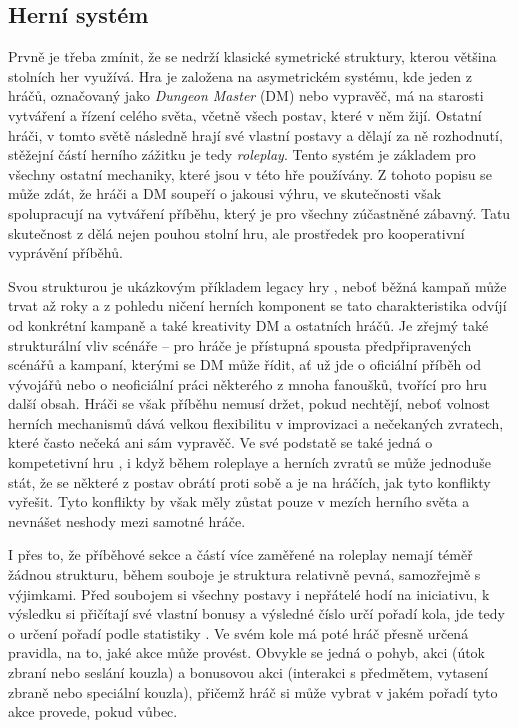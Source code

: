 \subsection{Herní systém}
\label{subsec:dnd_gameplay}

Prvně je třeba zmínit, že \dnd{} se nedrží klasické symetrické struktury, kterou většina stolních her využívá. Hra je založena na asymetrickém systému, kde jeden z hráčů, označovaný jako \textit{Dungeon Master} (DM) nebo vypravěč, má na starosti vytváření a řízení celého světa, včetně všech postav, které v něm žijí. Ostatní hráči, v tomto světě následně hrají své vlastní postavy a dělají za ně rozhodnutí, stěžejní částí herního zážitku je tedy \textit{roleplay}. Tento systém je základem pro všechny ostatní mechaniky, které jsou v této hře používány. Z tohoto popisu se může zdát, že hráči a DM soupeří o jakousi výhru, ve skutečnosti však spolupracují na vytváření příběhu, který je pro všechny zúčastněné zábavný. Tatu skutečnost z \dnd{} dělá nejen pouhou stolní hru, ale prostředek pro kooperativní vyprávění příběhů.

Svou strukturou je \dnd{} ukázkovým příkladem legacy hry , neboť běžná kampaň může trvat až roky a z pohledu ničení herních komponent se tato charakteristika odvíjí od konkrétní kampaně a také kreativity DM a ostatních hráčů. Je zřejmý také strukturální vliv scénáře  -- pro hráče je přístupná spousta předpřipravených scénářů a kampaní, kterými se DM může řídit, ať už jde o oficiální příběh od vývojářů nebo o neoficiální práci některého z mnoha fanoušků, tvořící pro hru další obsah. Hráči se však příběhu nemusí držet, pokud nechtějí, neboť volnost herních mechanismů dává velkou flexibilitu v improvizaci a nečekaných zvratech, které často nečeká ani sám vypravěč. Ve své podstatě se také jedná o kompetetivní hru , i když během roleplaye a herních zvratů se může jednoduše stát, že se některé z postav obrátí proti sobě a je na hráčích, jak tyto konflikty vyřešit. Tyto konflikty by však měly zůstat pouze v mezích herního světa a nevnášet neshody mezi samotné hráče.

I přes to, že příběhové sekce a částí více zaměřené na roleplay nemají téměř žádnou strukturu, během souboje je struktura relativně pevná, samozřejmě s výjimkami. Před soubojem si všechny postavy i nepřátelé hodí na iniciativu, k výsledku si přičítají své vlastní bonusy a výsledné číslo určí pořadí kola, jde tedy o určení pořadí podle statistiky . Ve svém kole má poté hráč přesně určená pravidla, na to, jaké akce může provést. Obvykle se jedná o pohyb, akci (útok zbraní nebo seslání kouzla) a bonusovou akci (interakci s předmětem, vytasení zbraně nebo speciální kouzla), přičemž hráč si může vybrat v jakém pořadí tyto akce provede, pokud vůbec. 

